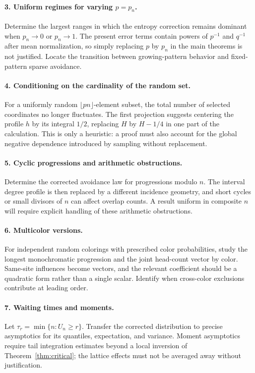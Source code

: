 \documentclass[11pt]{article}
\theoremstyle{definition}\newtheorem{definition}[theorem]{Definition}
\theoremstyle{remark}\newtheorem{remark}[theorem]{Remark}
\begin{document}
\paragraph{3. Uniform regimes for varying $p=p_n$.}
Determine the largest ranges in which the entropy correction remains
dominant when $p_n\to0$ or $p_n\to1$. The present error terms contain
powers of $p^{-1}$ and $q^{-1}$ after mean normalization, so simply
replacing $p$ by $p_n$ in the main theorems is not justified. Locate the
transition between growing-pattern behavior and fixed-pattern sparse
avoidance.

\paragraph{4. Conditioning on the cardinality of the random set.}
For a uniformly random $\lfloor pn\rfloor$-element subset, the total
number of selected coordinates no longer fluctuates. The first projection
suggests centering the profile $h$ by its integral $1/2$, replacing $H$
by $H-1/4$ in one part of the calculation. This is only a heuristic:
a proof must also account for the global negative dependence introduced
by sampling without replacement.

\paragraph{5. Cyclic progressions and arithmetic obstructions.}
Determine the corrected avoidance law for progressions modulo $n$.
The interval degree profile is then replaced by a different incidence
geometry, and short cycles or small divisors of $n$ can affect overlap
counts. A result uniform in composite $n$ will require explicit handling
of these arithmetic obstructions.

\paragraph{6. Multicolor versions.}
For independent random colorings with prescribed color probabilities,
study the longest monochromatic progression and the joint head-count
vector by color. Same-site influences become vectors, and the relevant
coefficient should be a quadratic form rather than a single scalar.
Identify when cross-color exclusions contribute at leading order.

\paragraph{7. Waiting times and moments.}
Let $\tau_r=\min\{n:U_n\ge r\}$. Transfer the corrected distribution
to precise asymptotics for its quantiles, expectation, and variance.
Moment asymptotics require tail integration estimates beyond a local
inversion of Theorem~\ref{thm:critical}; the lattice effects must not be
averaged away without justification.
\end{document}
